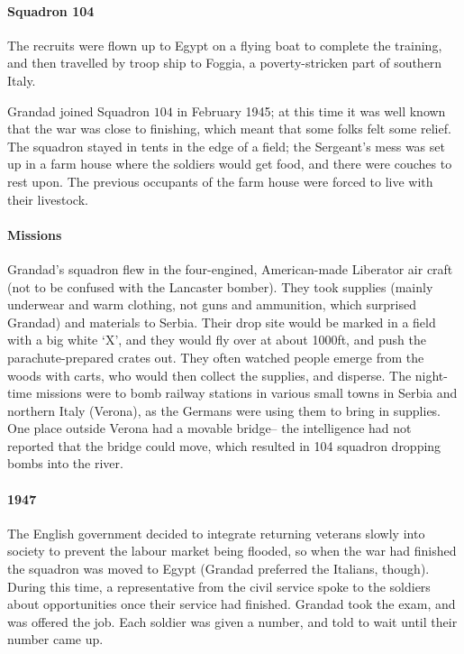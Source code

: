 \documentclass[11pt]{article}
\begin{document}
\paragraph{Squadron 104} The recruits were flown up to Egypt on a flying boat to complete the training, and 
  then travelled by troop ship to Foggia, a poverty-stricken part of southern Italy.

  Grandad joined Squadron $104$ in February 1945; at this time it was well known that 
  the war was close to finishing, which meant that some folks felt some relief. The 
  squadron stayed in tents in the edge of a field; the Sergeant's mess was set up 
  in a farm house where the soldiers would get food, and there were couches to rest upon.
  The previous occupants of the farm house were forced to live with their livestock.

\paragraph{Missions} Grandad's squadron flew in the four-engined, American-made Liberator air craft (not to be 
  confused with the Lancaster bomber). They
  took supplies (mainly underwear and warm clothing, not guns and ammunition, which surprised Grandad)
  and materials to Serbia. Their drop site would 
  be marked in a field with a big white `X', and they would fly over at about 1000ft, and push 
  the parachute-prepared crates out. They often watched people emerge from the woods with carts, 
  who would then collect the supplies, and disperse.
  The night-time missions were to bomb railway stations in various small towns in Serbia and northern Italy (Verona), 
  as the Germans were using them to bring in supplies. One place outside Verona had a movable bridge-- the 
  intelligence had not reported that the bridge could move, which resulted in 104 squadron dropping bombs into 
  the river.

\paragraph{1947} The English government 
  decided to integrate returning veterans slowly into society to prevent the labour market being
  flooded, so when the war had finished the squadron was moved to Egypt (Grandad preferred the Italians, though). 
  During this time, a 
  representative from the civil service spoke to the soldiers about opportunities once their 
  service had finished. Grandad took the exam, and was offered the job. Each soldier was given 
  a number, and told to wait until their number came up.
\begin{figure}
  \centering
\end{figure}
\end{document}
